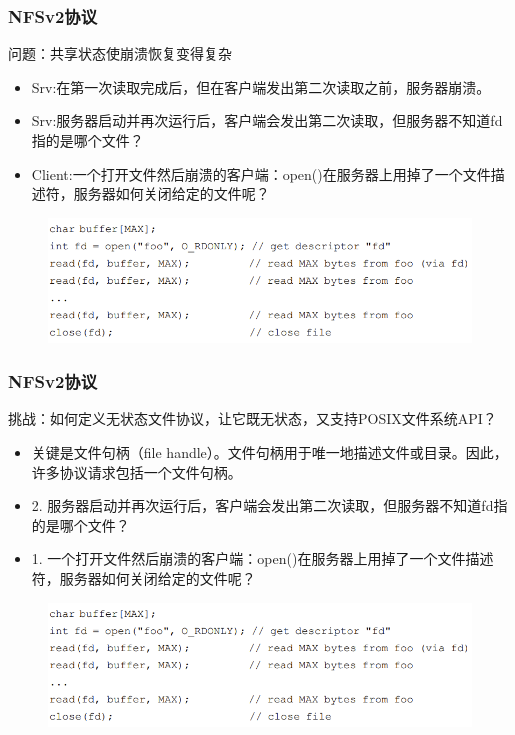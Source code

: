 \begin{frame}[fragile]
    \frametitle{NFSv2协议}
    问题：共享状态使崩溃恢复变得复杂
    \begin{itemize}
        \item Srv:在第一次读取完成后，但在客户端发出第二次读取之前，服务器崩溃。
        \item Srv:服务器启动并再次运行后，客户端会发出第二次读取，但服务器不知道fd指的是哪个文件？
        \item Client:一个打开文件然后崩溃的客户端：open()在服务器上用掉了一个文件描述符，服务器如何关闭给定的文件呢？
    \end{itemize}
    \begin{figure}
        \includegraphics[width=0.8\linewidth]{figs/stateful-code.png}
    \end{figure}

\end{frame}

\begin{frame}[fragile]
    \frametitle{NFSv2协议}
    挑战：如何定义无状态文件协议，让它既无状态，又支持POSIX文件系统API？
    \begin{itemize}
        \item 关键是文件句柄（file handle）。文件句柄用于唯一地描述文件或目录。因此，许多协议请求包括一个文件句柄。        
        \item 2. 服务器启动并再次运行后，客户端会发出第二次读取，但服务器不知道fd指的是哪个文件？
        \item 1. 一个打开文件然后崩溃的客户端：open()在服务器上用掉了一个文件描述符，服务器如何关闭给定的文件呢？
    \end{itemize}
    \begin{figure}
        \includegraphics[width=0.8\linewidth]{figs/stateful-code.png}
    \end{figure}
    
\end{frame}


